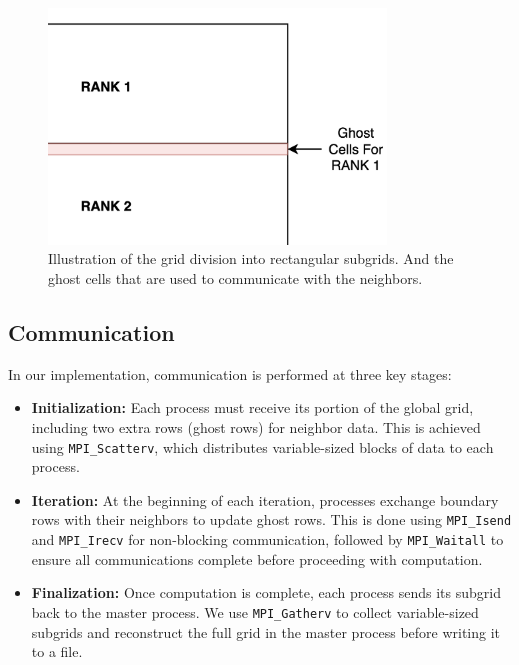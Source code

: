 \documentclass[12pt]{article}
\begin{document}
\begin{figure}[h!]
	\centering
	\includegraphics[width=0.8\textwidth]{ghost_cells.png}
	\caption{Illustration of the grid division into rectangular subgrids. And the ghost cells that are used to communicate with the neighbors.}
	\label{fig:grid_division}
\end{figure}

\newpage
\subsection{Communication}
In our implementation, communication is performed at three key stages:

\begin{itemize}
	\item \textbf{Initialization:} Each process must receive its portion of the global grid, including two extra rows (ghost rows) for neighbor data. This is achieved using \texttt{MPI\_Scatterv}, which distributes variable-sized blocks of data to each process.

	\item \textbf{Iteration:} At the beginning of each iteration, processes exchange boundary rows with their neighbors to update ghost rows. This is done using \texttt{MPI\_Isend} and \texttt{MPI\_Irecv} for non-blocking communication, followed by \texttt{MPI\_Waitall} to ensure all communications complete before proceeding with computation.

	\item \textbf{Finalization:} Once computation is complete, each process sends its subgrid back to the master process. We use \texttt{MPI\_Gatherv} to collect variable-sized subgrids and reconstruct the full grid in the master process before writing it to a file.
\end{itemize}
\end{document}

